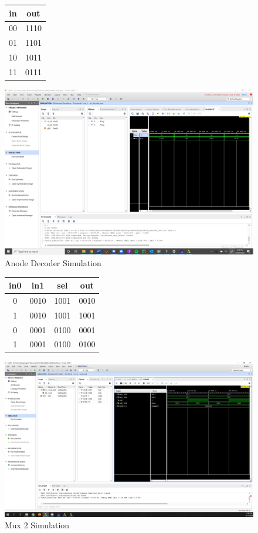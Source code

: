 \documentclass[11pt]{article}
\begin{document}
\begin{figure}[ht] \centering
	
	\begin{tabular}{c|c}
		\toprule
		in & out \\
		\midrule
		00 & 1110 \\
		01 & 1101 \\
		10 & 1011 \\
		11 & 0111 \\
		\bottomrule
	\end{tabular}
	
	\includegraphics[width=1\textwidth,trim=19cm 19cm 0cm 6cm,clip]{an_decoder_test_scrn}
	\caption{Anode Decoder Simulation}
	\label{fig:img3}
\end{figure}

\begin{figure}[ht] \centering
	
	\begin{tabular}{ccc|c}
		\toprule
		in0 & in1 & sel & out \\
		\midrule
		0 & 0010 & 1001 & 0010 \\
		1 & 0010 & 1001 & 1001 \\
		0 & 0001 & 0100 & 0001 \\
		1 & 0001 & 0100 & 0100 \\
		\bottomrule
	\end{tabular}
	
	\includegraphics[width=1\textwidth,trim=21cm 19cm 0cm 6cm,clip]{mux2_test_scrn}
	\caption{Mux 2 Simulation}
	\label{fig:img1}
\end{figure}
\end{document}
